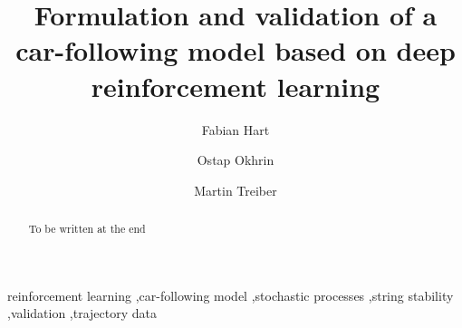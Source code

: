 \documentclass[review]{elsarticle}
\providecommand{\3}{{\ss}}
\begin{document}
\begin{frontmatter}

\title{Formulation and validation of a car-following model based on deep
  reinforcement learning}


\author[firstAddress]{Fabian Hart}
\author[firstAddress,secondAddress]{Ostap Okhrin}
\author[firstAddress,secondAddress]{Martin Treiber}

\address[firstAddress]{TU Dresden}
\address[secondAddress]{Possible second address}




\begin{abstract}
To be written at the end
\end{abstract}

\begin{keyword}
reinforcement learning \sep car-following model \sep stochastic
processes \sep string stability \sep validation \sep trajectory data 
\end{keyword}

\end{frontmatter}

\end{document}
